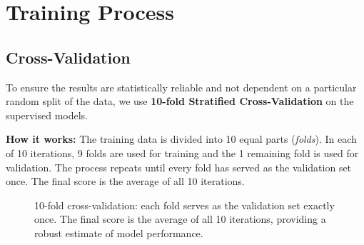 \section{Training Process}

\subsection{Cross-Validation}

To ensure the results are statistically reliable and not dependent on a particular random split of the data, we use \textbf{10-fold Stratified Cross-Validation} on the supervised models.

\textbf{How it works:} The training data is divided into 10 equal parts (\textit{folds}). In each of 10 iterations, 9 folds are used for training and the 1 remaining fold is used for validation. The process repeats until every fold has served as the validation set once. The final score is the average of all 10 iterations.

\begin{figure}[H]
\centering
{}
\caption{10-fold cross-validation: each fold serves as the validation set exactly once. The final score is the average of all 10 iterations, providing a robust estimate of model performance.}
\label{fig:cv}
\end{figure}

